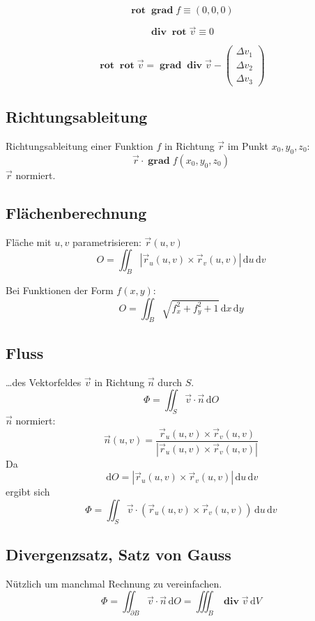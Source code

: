 \documentclass[12pt]{article}
\newcommand{\ud}{\,\mathrm{d}}
\DeclareMathOperator{\grad}{\mathbf{grad}}
\DeclareMathOperator{\divergenz}{\mathbf{div}}
\DeclareMathOperator{\rot}{\mathbf{rot}}
\begin{document}
\begin{multicols*}{3}
					\[
						\rot \grad f \equiv (0,0,0)
					\]
					
					\[
						\divergenz \rot \vec{v} \equiv 0
					\]
					
					\[
						\rot \rot \vec{v} = \grad \divergenz \vec{v} - \left(\begin{array}{c}
							\Delta v_1 \\
							\Delta v_2 \\
							\Delta v_3
						\end{array}\right)
					\]
			\subsection{Richtungsableitung} %
				Richtungsableitung einer Funktion $f$ in Richtung $\vec{r}$ im Punkt $x_0, y_0, z_0$:
				\[
					\vec{r} \cdot \grad f(x_0, y_0, z_0)
				\]
				$\vec{r}$ normiert.
			\subsection{Flächenberechnung} %
				Fläche mit $u,v$ parametrisieren: $\vec{r}(u,v)$
				\[
					O = \iint_B |\vec{r}_u (u,v) \times \vec{r}_v (u,v) | \ud u \ud v
				\]
				
				Bei Funktionen der Form $f(x,y)$:
				\[
					O = \iint_B \sqrt{f_x^2 + f_y^2 + 1} \ud x \ud y
				\]
			\subsection{Fluss} %
				\ldots des Vektorfeldes $\vec{v}$ in Richtung $\vec{n}$ durch $S$.
				\[
					\Phi = \iint_S \vec{v} \cdot \vec{n} \ud O
				\]
				$\vec{n}$ normiert:
				\[
					\vec{n}(u,v) = \frac{\vec{r}_u (u,v) \times \vec{r}_v (u,v)}{|\vec{r}_u (u,v) \times \vec{r}_v (u,v)|}
				\]
				Da
				\[
					\ud O = |\vec{r}_u (u,v) \times \vec{r}_v (u,v)| \ud u \ud v
				\]
				ergibt sich
				\[
					\Phi = \iint_S \vec{v} \cdot (\vec{r}_u (u,v) \times \vec{r}_v (u,v)) \ud u \ud v
				\]
			\subsection{Divergenzsatz, Satz von Gauss} %
				Nützlich um manchmal Rechnung zu vereinfachen.
				\[
					\Phi = \iint_{\partial B} \vec{v} \cdot \vec{n} \ud O
					     = \iiint_B \divergenz \vec{v} \ud V
				\]

\end{multicols*}
\end{document}
